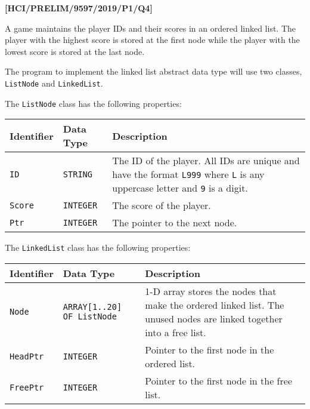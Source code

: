 \item \textbf{{[}HCI/PRELIM/9597/2019/P1/Q4{]} }

A game maintains the player IDs and their scores in an ordered linked
list. The player with the highest score is stored at the first node
while the player with the lowest score is stored at the last node. 

The program to implement the linked list abstract data type will use
two classes, \texttt{ListNode} and \texttt{LinkedList}. 

The \texttt{ListNode} class has the following properties:
\noindent \begin{center}
\begin{tabular}{|l|l|l|}
\hline 
\texttt{\hspace{0.01\columnwidth}}Identifier & \texttt{\hspace{0.01\columnwidth}}Data Type & \texttt{\hspace{0.05\columnwidth}}Description\tabularnewline
\hline 
\texttt{ID} & \texttt{STRING} & The ID of the player. All IDs are unique and have the format \texttt{L999}
where \texttt{L} is any uppercase letter and \texttt{9} is a digit.\tabularnewline
\hline 
\texttt{Score} & \texttt{INTEGER} & The score of the player.\tabularnewline
\hline 
\texttt{Ptr} & \texttt{INTEGER} & The pointer to the next node.\tabularnewline
\hline 
\end{tabular}
\par\end{center}

The \texttt{LinkedList} class has the following properties: 
\noindent \begin{center}
\begin{tabular}{|l|l|l|}
\hline 
\texttt{\hspace{0.01\columnwidth}}Identifier & \texttt{\hspace{0.01\columnwidth}}Data Type & \texttt{\hspace{0.05\columnwidth}}Description\tabularnewline
\hline 
\texttt{Node} & \texttt{ARRAY{[}1..20{]} OF ListNode} & 1-D array stores the nodes that make the ordered linked list. The
unused nodes are linked together into a free list.\tabularnewline
\hline 
\texttt{HeadPtr} & \texttt{INTEGER} & Pointer to the first node in the ordered list.\tabularnewline
\hline 
\texttt{FreePtr} & \texttt{INTEGER} & Pointer to the first node in the free list.\tabularnewline
\hline 
\end{tabular}
\par\end{center}

